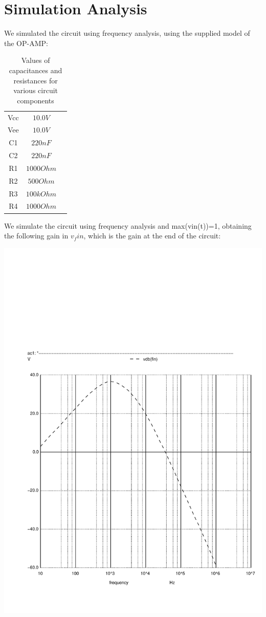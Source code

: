 \section{Simulation Analysis}
\label{sec:simulation}

We simulated the circuit using frequency analysis, using the supplied model of the OP-AMP:

\begin{table}[H]
\addtolength{\tabcolsep}{-4pt}
\caption{Values of capacitances and resistances for various circuit components}
\vspace{-3mm}
\begin{tabular}{|c|c|c|}
\hline
Vcc & $10.0 V$\\
Vee & $10.0 V$\\
C1 & $220 nF$\\
C2 & $220 nF$\\
R1 & $1000 Ohm$\\
R2 & $500 Ohm$\\
R3 & $100 kOhm$\\
R4 & $1000 Ohm$\\
\hline
\end{tabular}
\label{tab:Components}
\end{table}

\par

We simulate the circuit using frequency analysis and max(vin(t))=1, obtaining the following gain in $v_fin$, which is the gain at the end of the circuit:

\includegraphics[width=0.8\linewidth]{../sim/vo1f.pdf}

